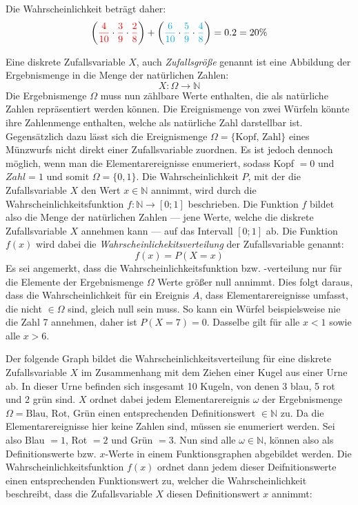 \vspace{\parskip}

Die Wahrscheinlichkeit betr\"{a}gt daher: $$\left({\color{red} \frac{4}{10}} \cdot {\color{red} \frac{3}{9}} \cdot {\color{red} \frac{2}{8}}\right) + \left({\color{cyan} \frac{6}{10}} \cdot {\color{cyan}\frac{5}{9}} \cdot {\color{cyan}\frac{4}{8}}\right) = 0.2 = 20 \%$$


Eine diskrete Zufallsvariable $X$, auch \emph{Zufallsgr\"{o}\ss{}e} genannt ist eine Abbildung der Ergebnismenge in die Menge der nat\"{u}rlichen Zahlen: $$X: \Omega \rightarrow \mathbb{N}$$ Die Ergebnismenge $\Omega$ muss nun z\"{a}hlbare Werte enthalten, die als nat\"{u}rliche Zahlen repr\"{a}sentiert werden k\"{o}nnen. Die Ereignismenge von zwei W\"{u}rfeln k\"{o}nnte ihre Zahlenmenge enthalten, welche als nat\"{u}rliche Zahl darstellbar ist. Gegens\"{a}tzlich dazu l\"{a}sst sich die Ereignismenge $\Omega = \{ \text{Kopf, Zahl} \}$ eines M\"{u}nzwurfs nicht direkt einer Zufallsvariable zuordnen. Es ist jedoch dennoch m\"{o}glich, wenn man die Elementarereignisse enumeriert, sodass Kopf $= 0$ und $Zahl = 1$ und somit $\Omega = \{0 , 1\}$. Die Wahrscheinlichkeit $P$, mit der die Zufallsvariable $X$ den Wert $x \in \mathbb{N}$ annimmt, wird durch die Wahrscheinlichkeitsfunktion $f: \mathbb{N} \rightarrow [0 ; 1]$ beschrieben. Die Funktion $f$ bildet also die Menge der nat\"{u}rlichen Zahlen --- jene Werte, welche die diskrete Zufallsvariable $X$ annehmen kann --- auf das Intervall $[0 ; 1]$ ab. Die Funktion $f(x)$ wird dabei die \emph{Wahrscheinlichekitsverteilung} der Zufallsvariable genannt: $$f(x) = P(X = x)$$ Es sei angemerkt, dass die Wahrscheinlichkeitsfunktion bzw. -verteilung nur f\"{u}r die Elemente der Ergebnismenge $\Omega$ Werte gr\"{o}\ss{}er null annimmt. Dies folgt daraus, dass die Wahrscheinlichkeit f\"{u}r ein Ereignis $A$, dass Elementarereignisse umfasst, die nicht $\in \Omega$ sind, gleich null sein muss. So kann ein W\"{u}rfel beispielsweise nie die Zahl 7 annehmen, daher ist $P(X = 7) = 0$. Dasselbe gilt f\"{u}r alle $x < 1$ sowie alle $x > 6$.

\pagebreak

Der folgende Graph bildet die Wahrscheinlichkeitsverteilung f\"{u}r eine diskrete Zufallsvariable $X$ im Zusammenhang mit dem Ziehen einer Kugel aus einer Urne ab. In dieser Urne befinden sich insgesamt 10 Kugeln, von denen 3 blau, 5 rot und 2 gr\"{u}n sind. $X$ ordnet dabei jedem Elementarereignis $\omega$ der Ergebnismenge $\Omega = {\text{Blau, Rot, Gr\"{u}n}}$ einen entsprechenden Definitionswert $\in \mathbb{N}$ zu. Da die Elementarereignisse hier keine Zahlen sind, m\"{u}ssen sie enumeriert werden. Sei also Blau $= 1$, Rot $= 2$ und Gr\"{u}n $= 3$. Nun sind alle $\omega \in \mathbb{N}$, k\"{o}nnen also als Definitionswerte bzw. $x$-Werte in einem Funktionsgraphen abgebildet werden. Die Wahrscheinlichkeitsfunktion $f(x)$ ordnet dann jedem dieser Deifnitionswerte einen entsprechenden Funktionswert zu, welcher die Wahrscheinlichkeit beschreibt, dass die Zufallsvariable $X$ diesen Definitionswert $x$ annimmt:

